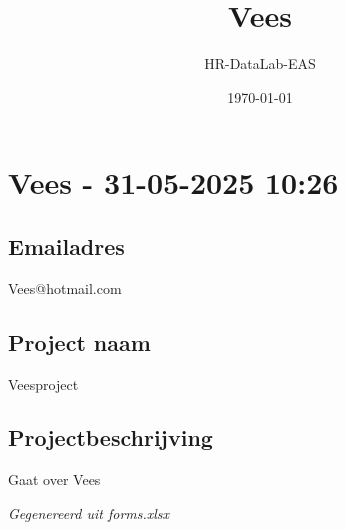 \documentclass[a4paper,11pt]{article}
\title{Vees}
\author{HR-DataLab-EAS}
\date{\today}
\begin{document}
\maketitle

\section*{Vees - 31-05-2025 10:26}
\hrulefill


\subsection*{Emailadres}
Vees@hotmail.com


\subsection*{Project naam}
Veesproject


\subsection*{Projectbeschrijving}
Gaat over Vees


\hrulefill

\textit{Gegenereerd uit forms.xlsx}
\end{document}
